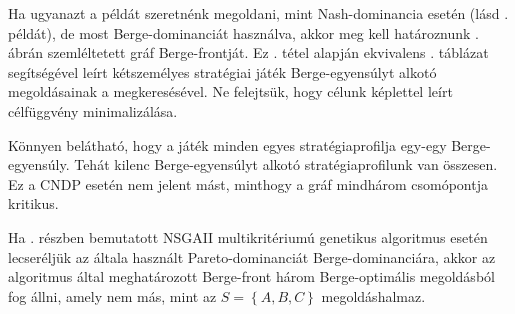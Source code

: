\begin{pld}
  Ha ugyanazt a példát szeretnénk megoldani, mint Nash-dominancia esetén (lásd . példát), de most Berge-dominanciát használva,
  akkor meg kell határoznunk . ábrán szemléltetett gráf Berge-frontját.
  Ez . tétel alapján ekvivalens . táblázat segítségével leírt kétszemélyes stratégiai játék Berge-egyensúlyt alkotó megoldásainak a megkeresésével.
  Ne felejtsük, hogy célunk  képlettel leírt célfüggvény minimalizálása.

  Könnyen belátható, hogy a játék minden egyes stratégiaprofilja egy-egy Berge-egyensúly. Tehát kilenc Berge-egyensúlyt alkotó stratégiaprofilunk van összesen.
  Ez a CNDP esetén nem jelent mást, minthogy a gráf mindhárom csomópontja kritikus.

  Ha . részben bemutatott NSGAII multikritériumú genetikus algoritmus esetén lecseréljük az általa használt Pareto-dominanciát Berge-dominanciára,
  akkor az algoritmus által meghatározott Berge-front három Berge-optimális megoldásból fog állni, amely nem más, mint az $S = \left\{ A, B, C \right\}$ megoldáshalmaz.
\end{pld}
